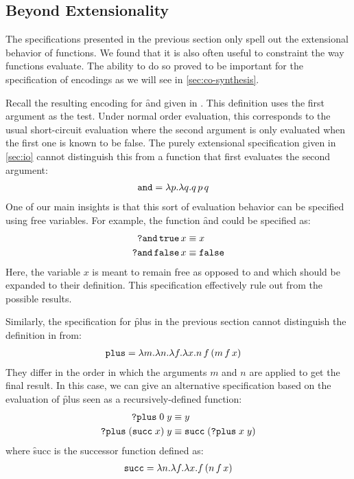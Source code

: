\subsection{Beyond Extensionality}
%
The specifications presented in the previous section only
spell out the extensional behavior of functions.
%
We found that it is also often useful to constraint the way
functions evaluate.
%
The ability to do so proved to be important for the
specification of encodings as we will see in
\cref{sec:co-synthesis}.

Recall the resulting encoding for \f{and} given in
.
%
This definition uses the first argument as the test.
%
Under normal order evaluation, this corresponds to the usual
short-circuit evaluation where the second argument is only
evaluated when the first one is known to be false.
%
The purely extensional specification given in \cref{sec:io}
cannot distinguish this from a function that first
evaluates the second argument:
%
\begin{align}
  \label{eq:and-def2}
  \texttt{and} &= \lambda p. \lambda q. q\,p\,q
\end{align}
%
One of our main insights is that this sort of evaluation
behavior can be specified using free variables.
%
For example, the function \f{and} could be specified as:
%
\begin{align*}
  \texttt{?and}\,\texttt{true}\,x &\equiv x \\
  \texttt{?and}\,\texttt{false}\,x &\equiv \texttt{false} \\
\end{align*}
%
Here, the variable $x$ is meant to remain free as opposed to
\true and \false which should be expanded to their
definition.
%
This specification effectively rule out
 from the possible results.

Similarly, the specification for \f{plus} in the previous
section cannot distinguish the definition in
 from:
%
\begin{align}
  \label{eq:plus-def2}
  \texttt{plus} &= \lambda m.\lambda n.\lambda f.\lambda x.n\,f\,(m\,f\,x)
\end{align}
%
They differ in the order in which the arguments $m$ and $n$
are applied to get the final result.
%
In this case, we can give an alternative specification based
on the evaluation of \f{plus} seen as a recursively-defined
function:
%
\begin{align*}
  \texttt{?plus}\;0\;y &\equiv y \\
  \texttt{?plus}\;(\texttt{succ}\;x)\;y &\equiv \texttt{succ}\;(\texttt{?plus}\;x\;y)
\end{align*}
%
where \f{succ} is the successor function defined as:
%
\begin{align*}
  \texttt{succ} = \lambda n. \lambda f. \lambda x. f\,(n\,f\,x)
\end{align*}

